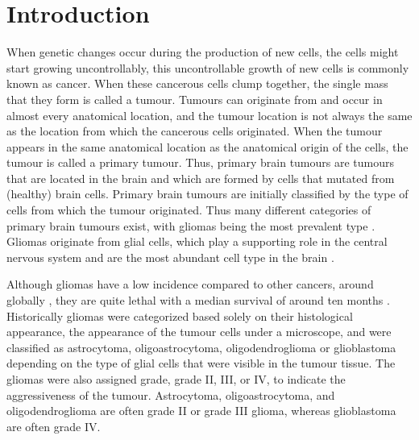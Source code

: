 
\chapter{Introduction}

When genetic changes occur during the production of new cells, the cells might start growing uncontrollably, this uncontrollable growth of new cells is commonly known as cancer. When these cancerous cells clump together, the single mass that they form is called a tumour.
Tumours can originate from and occur in almost every anatomical location, and the tumour location is not always the same as the location from which the cancerous cells originated.
When the tumour appears in the same anatomical location as the anatomical origin of the cells, the tumour is called a primary tumour.
Thus, primary brain tumours are tumours that are located in the brain and which are formed by cells that mutated from (healthy) brain cells.
Primary brain tumours are initially classified by the type of cells from which the tumour originated.
Thus many different categories of primary brain tumours exist, with gliomas being the most prevalent type \autocite{leece2017indicence}.
Gliomas originate from glial cells, which play a supporting role in the central nervous system and are the most abundant cell type in the brain \autocite{jakel2017glial}.

Although gliomas have a low incidence compared to other cancers, around  globally \autocite{leece2017indicence}, they are quite lethal with a median survival of around ten months \autocite{hess2004gliomaincidence}.
Historically gliomas were categorized based solely on their histological appearance, the appearance of the tumour cells under a microscope, and were classified as astrocytoma, oligoastrocytoma, oligodendroglioma or glioblastoma depending on the type of glial cells that were visible in the tumour tissue. The gliomas were also assigned grade, grade II, III, or IV, to indicate the aggressiveness of the tumour.  Astrocytoma, oligoastrocytoma, and oligodendroglioma are often grade II or grade III glioma, whereas glioblastoma are often grade IV.

